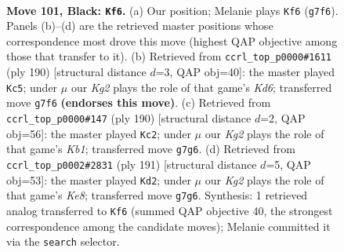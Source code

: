 \documentclass[11pt]{article}
\begin{document}
\clearpage

\begin{figure}[p]\centering
\begin{subfigure}{0.46\textwidth}\centering
\resizebox{\linewidth}{!}{%
\newchessgame
\chessboard[
  setfen={8/1R4k1/8/8/8/7K/5p2/3r4 b - - 17 101},
  showmover=false,
  pgfstyle=straightmove, color=movearrow, markmove={g7-f6}
]}
\caption{}
\end{subfigure}\hfill
\begin{subfigure}{0.46\textwidth}\centering
\resizebox{\linewidth}{!}{%
\newchessgame
\chessboard[
  setfen={3k4/7R/3K2r1/8/3P4/8/8/8 w - - 19 96},
  showmover=false,
  pgfstyle=straightmove, color=movearrow, markmove={d6-c5}
]}
\caption{}
\end{subfigure}
\\[4pt]
\begin{subfigure}{0.46\textwidth}\centering
\resizebox{\linewidth}{!}{%
\newchessgame
\chessboard[
  setfen={1k6/8/8/8/8/2R5/8/1K5r w - - 22 96},
  showmover=false,
  pgfstyle=straightmove, color=movearrow, markmove={b1-c2}
]}
\caption{}
\end{subfigure}\hfill
\begin{subfigure}{0.46\textwidth}\centering
\resizebox{\linewidth}{!}{%
\newchessgame
\chessboard[
  setfen={8/7r/8/8/4p3/4P3/6K1/R3k3 b - - 13 96},
  showmover=false,
  pgfstyle=straightmove, color=movearrow, markmove={e1-d2}
]}
\caption{}
\end{subfigure}
\caption{\textbf{Move 101, Black: \texttt{Kf6}.} (a) Our position; Melanie plays \texttt{Kf6} (\texttt{g7f6}). Panels (b)--(d) are the retrieved master positions whose correspondence most drove this move (highest QAP objective among those that transfer to it). (b) Retrieved from \texttt{ccrl\_top\_p0000\#1611} (ply 190) [structural distance $d$=3, QAP obj=40]: the master played \texttt{Kc5}; under $\mu$ our \emph{Kg2} plays the role of that game's \emph{Kd6}; transferred move \texttt{g7f6} \textbf{(endorses this move)}. (c) Retrieved from \texttt{ccrl\_top\_p0000\#147} (ply 190) [structural distance $d$=2, QAP obj=56]: the master played \texttt{Kc2}; under $\mu$ our \emph{Kg2} plays the role of that game's \emph{Kb1}; transferred move \texttt{g7g6}. (d) Retrieved from \texttt{ccrl\_top\_p0002\#2831} (ply 191) [structural distance $d$=5, QAP obj=53]: the master played \texttt{Kd2}; under $\mu$ our \emph{Kg2} plays the role of that game's \emph{Ke8}; transferred move \texttt{g7g6}. Synthesis: 1 retrieved analog transferred to \texttt{Kf6} (summed QAP objective 40, the strongest correspondence among the candidate moves); Melanie committed it via the \texttt{search} selector.}
\label{fig:thought-m201}
\end{figure}
\end{document}
